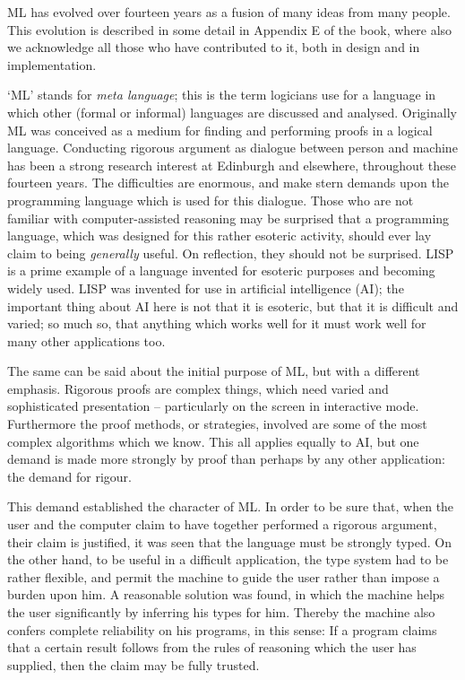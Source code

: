 ML has evolved over fourteen 
years as a fusion of many ideas from many people. This evolution is
described in some detail in Appendix E of the book, where also we
acknowledge all those who have contributed to it, both in design
and in implementation.

`ML' stands for 
{\sl meta language}; this is the term logicians use for a language in which
other (formal or informal) languages are discussed and analysed.  
Originally ML was conceived as a medium for finding and performing 
proofs in a logical language.   Conducting rigorous argument as dialogue 
between person and machine has been a strong research interest at Edinburgh 
and elsewhere, throughout these fourteen years. The difficulties are enormous, 
and make stern demands
upon the programming language which is used for this dialogue.   Those who are
not familiar with computer-assisted reasoning may be surprised that a 
programming language, which was designed for this rather esoteric activity, 
should ever lay claim to being {\sl generally} useful.
On reflection, they should not be surprised.  LISP is a prime example of
a language invented for esoteric purposes and becoming widely used.  LISP
was invented for use in artificial intelligence (AI); the important thing
about AI here is not that it is esoteric,  but that
it is difficult and varied; so much so, that anything which works well for
it must work well for many other applications too.

The same can be said about the initial purpose of ML, but with a different
emphasis.  Rigorous proofs are complex things, which need varied
and sophisticated presentation -- particularly on the screen in interactive
mode. Furthermore the proof methods, or
strategies, involved are some of the most complex algorithms which we know.   
This all applies equally to AI, but one demand is made more strongly 
by proof than perhaps by any other application: the demand for rigour.  

This demand established the character of ML.  In order to be sure that,
when the user and the computer claim to have together performed a rigorous
argument, their claim is justified, it was seen 
that the language must be strongly typed. On the other hand, to be
useful in a difficult  application, the type system had to be rather
flexible, and permit the machine to guide the user rather than impose
a burden upon him.   A reasonable solution was found, in which the machine
helps the user significantly  by
inferring his types for him. Thereby the machine also confers complete
reliability on his programs, in this sense: 
If a program claims that a certain result 
follows from the rules of reasoning which the user has supplied, then the 
claim may be fully trusted.

